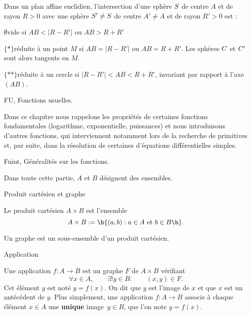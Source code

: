 \noindent
Dans un plan affine euclidien, l'intersection d'une sph\`ere $\sc S$ de centre $A$ et de rayon $R>0$ avec une sph\`ere $\sc S'\neq\sc S$ de centre $A'\neq A$ et de rayon $R'>0$ est :
\medskip
\noindent
\item{$\emptyset$}vide si $AB<|R-R'|$ ou $AB>R+R'$
\medskip
\noindent
\item{$\{*\}$}r\'eduite \`a un point $M$ si $AB=|R-R'|$ ou $AB=R+R'$. Les sph\`eres $\sc C$ et $\sc C'$ sont alors tangents en $M$. 
\medskip
\noindent
\item{$\{**\}$}r\'eduite \`a un cercle si $|R-R'|<AB<R+R'$, invariant par rapport \`a l'axe $(AB)$. 

















                  


\Chapter FU, Fonctions usuelles.

Dans ce chapitre nous rappelons les propri\'et\'es de certaines fonctions fondamentales (logarithme, exponentielle, puissances) 
et nous introduisons d'autres fonctions, qui interviennent notamment lors de la recherche de primitives et, par suite, dans la r\'esolution 
de certaines d'\'equations diff\'erentielles simples.

\Section Fuint, G\'en\'eralit\'es sur les fonctions. 

\noindent
Dans toute cette partie, $A$ et $B$ d\'esignent des ensembles. 
\bigskip

\Concept [] Produit cart\'esien et graphe

\Definition []  Le produit cart\'esien $A\times B$ est l'ensemble 
$$
A\times B:=\b\{(a,b):a\in A \mbox{ et }b\in B\b\}.
$$

\Definition []  Un graphe est un sous-ensemble d'un produit cart\'esien. 

\Concept [] Application

\Definition []  Une application $f:A\to B$ est un graphe $F$ de $A\times B$ v\'erifiant 
$$
\forall x\in A, \qquad \exists ! y\in B:\qquad (x,y)\in F.
$$
Cet \'el\'ement $y$ est not\'e $y=f(x)$. On dit que $y$ est l'image de $x$ et que $x$ est un ant\'ec\'edent de $y$. 
\bigskip
\noindent
Plus simplement, une application $f:A\to B$ associe \`a chaque \'el\'ement $x\in A$ une {\bf unique} image~$y\in B$, que l'on note $y=f(x)$. 
\bigskip

